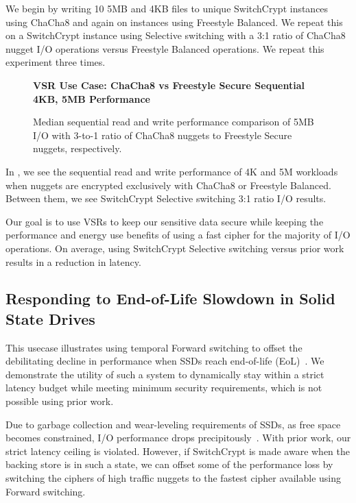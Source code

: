 We begin by writing 10 5MB and 4KB files to unique SwitchCrypt instances using
ChaCha8 and again on instances using Freestyle Balanced. We repeat this on a
SwitchCrypt instance using Selective switching with a 3:1 ratio of ChaCha8
nugget I/O operations versus Freestyle Balanced operations. We repeat this
experiment three times.

\begin{figure}[ht] \textbf{VSR Use Case: ChaCha8 vs Freestyle Secure Sequential
4KB, 5MB Performance}\par\medskip
   \centering
   {} \caption{Median sequential read and
   write performance comparison of 5MB I/O with 3-to-1 ratio of ChaCha8 nuggets
   to Freestyle Secure nuggets, respectively.}
  \label{fig:usecase-vsr-bar}
\end{figure}

In , we see the sequential read and write performance of
4K and 5M workloads when nuggets are encrypted exclusively with ChaCha8 or
Freestyle Balanced. Between them, we see SwitchCrypt Selective switching 3:1
ratio I/O results.

Our goal is to use VSRs to keep our sensitive data secure while keeping the
performance and energy use benefits of using a fast cipher for the majority of
I/O operations. On average, using SwitchCrypt Selective switching versus prior
work results in a  reduction in latency.

\subsection{Responding to End-of-Life Slowdown in Solid State Drives}

This usecase illustrates using temporal Forward switching to offset the
debilitating decline in performance when SSDs reach end-of-life
(EoL)~\cite{SSDEOL1, SSDEOL2, SSDEOL3}. We demonstrate the utility of such a
system to dynamically stay within a strict latency budget while meeting minimum
security requirements, which is not possible using prior work.

Due to garbage collection and wear-leveling requirements of SSDs, as free space
becomes constrained, I/O performance drops precipitously~\cite{SSDEOL1, SSDEOL2,
SSDEOL3}. With prior work, our strict latency ceiling is violated. However, if
SwitchCrypt is made aware when the backing store is in such a state, we can
offset some of the performance loss by switching the ciphers of high traffic
nuggets to the fastest cipher available using Forward switching.

